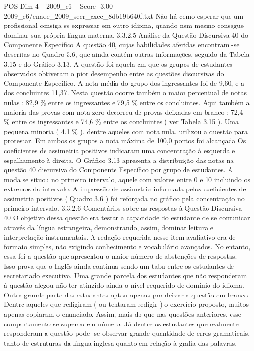 \begin{textsample}{POS Dim 4 – 2009\_c6 – Score -3.00 – 2009\_c6/enade\_2009\_secr\_exec\_8db19b640f.txt}
Não há como esperar que um profissional consiga se expressar em outro idioma, quando nem mesmo consegue dominar sua própria língua materna. 3.3.2.5 Análise da Questão Discursiva 40 do Componente Específico A questão 40, cujas habilidades aferidas encontram -se descritas no Quadro 3.6, que ainda contém outras informações, seguido da Tabela 3.15 e do Gráfico 3.13.
A questão foi aquela em que os grupos de estudantes observados obtiveram o pior desempenho entre as questões discursivas do Componente Específico.
A nota média do grupo dos ingressantes foi de 9,60, e a dos concluintes 11,37.
Nesta questão ocorre também o maior percentual de notas nulas : 82,9 \% entre os ingressantes e 79,5 \% entre os concluintes.
Aqui também a maioria das provas com nota zero decorreu de provas deixadas em branco : 72,4 \% entre os ingressantes e 74,6 \% entre os concluintes ( ver Tabela 3.15 ).
Uma pequena minoria ( 4,1 \% ), dentre aqueles com nota nula, utilizou a questão para protestar.
Em ambos os grupos a nota máxima de 100,0 pontos foi alcançada Os coeficientes de assimetria positivos indicaram uma concentração à esquerda e espalhamento à direita.
O Gráfico 3.13 apresenta a distribuição das notas na questão 40 discursiva do Componente Específico por grupo de estudantes.
A moda se situou no primeiro intervalo, aquele com valores entre 0 e 10 incluindo os extremos do intervalo.
A impressão de assimetria informada pelos coeficientes de assimetria positivos ( Quadro 3.6 ) foi reforçada no gráfico pela concentração no primeiro intervalo. 3.3.2.6 Comentários sobre as respostas à Questão Discursiva 40 O objetivo dessa questão era testar a capacidade do estudante de se comunicar através da língua estrangeira, demonstrando, assim, dominar leitura e interpretação instrumentais.
A redação requerida nesse item avaliativo era de formato simples, não exigindo conhecimento e vocabulário avançados.
No entanto, essa foi a questão que apresentou o maior número de abstenções de respostas.
Isso prova que o Inglês ainda continua sendo um tabu entre os estudantes de secretariado executivo.
Uma grande parcela dos estudantes que não responderam à questão alegou não ter atingido ainda o nível requerido de domínio do idioma.
Outra grande parte dos estudantes optou apenas por deixar a questão em branco.
Dentre aqueles que redigiram ( ou tentaram redigir ) o exercício proposto, muitos apenas copiaram o enunciado.
Assim, mais do que nas questões anteriores, esse comportamento se superou em número.
Já dentre os estudantes que realmente responderam à questão pode -se observar grande quantidade de erros gramaticais, tanto de estruturas da língua inglesa quanto em relação à grafia das palavras.

\end{textsample}
